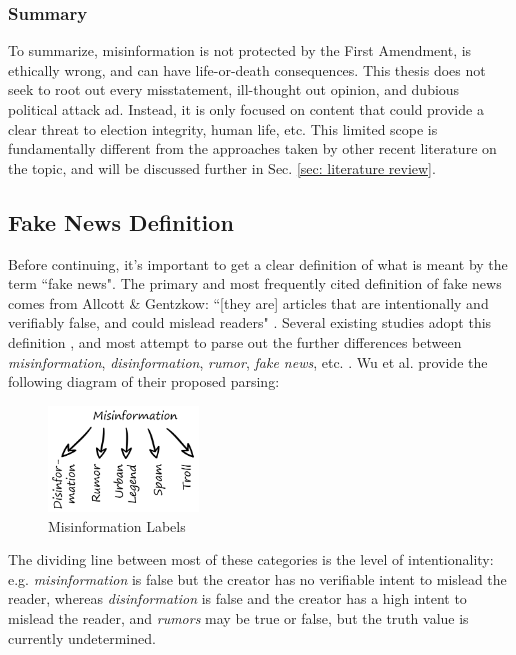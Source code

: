 \documentclass[preprint,review,12pt]{elsarticle}
\begin{document}
\subsubsection{Summary}
\label{misinformation summary}
To summarize, misinformation is not protected by the First Amendment, is ethically wrong, and can have life-or-death consequences. This thesis does not seek to root out every misstatement, ill-thought out opinion, and dubious political attack ad. Instead, it is only focused on content that could provide a clear threat to election integrity, human life, etc. This limited scope is fundamentally different from the approaches taken by other recent literature on the topic, and will be discussed further in Sec. \ref{sec: literature review}.

\subsection{Fake News Definition}
\label{Fake News Definition Section}
Before continuing, it's important to get a clear definition of what is meant by the term ``fake news". The primary and most frequently cited definition of fake news comes from Allcott \& Gentzkow: ``[they are] articles that are intentionally and verifiably false, and could mislead readers" \cite{allcott2017social}. Several existing studies adopt this definition \cite{conroy2015automatic,klein2017fake,rubin2015deception,rubin2017deception,mustafaraj2017fake,potthast2017stylometric}, and most attempt to parse out the further differences between \textit{misinformation}, \textit{disinformation}, \textit{rumor}, \textit{fake news}, etc. \cite{zimdars2020fake,  difonzo2007rumor,flynn2017nature,garrett2013undermining,wu2016mining}. Wu et al. provide the following diagram of their proposed parsing:
 \begin{figure}[htp]
    \centering
    \includegraphics[width=4cm]{misinformation graphic.png}
    \caption{Misinformation Labels \cite{wu2016mining}}
    \label{fig:misinformation graphic.png}
\end{figure}


The dividing line between most of these categories is the level of intentionality: e.g. \textit{misinformation} is false but the creator has no verifiable  intent to mislead the reader, whereas \textit{disinformation} is false and the creator has a high intent to mislead the reader, and \textit{rumors} may be true or false, but the truth value is currently undetermined.
\end{document}

